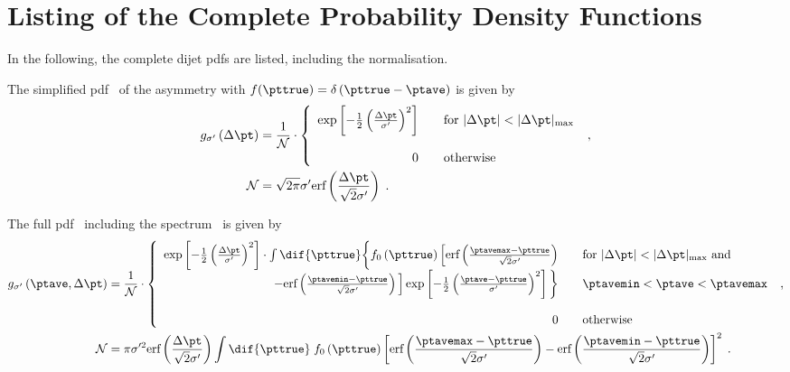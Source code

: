 \appendix


\section{Listing of the Complete Probability Density Functions}\label{sec:ResFit:App:Pdf}

In the following, the complete dijet pdfs are listed, including the normalisation.

The simplified pdf~ of the asymmetry with \mbox{$f(\pttrue)  = \delta\left(\pttrue - \ptave\right)$} is given by
\begin{align}
  \begin{split}
    \label{eq:ResFit:App:SimplePdf}
    g_{\sigma'}\left(\Delta\pt\right) & = \frac{1}{\mathcal{N}}\cdot\left\{
      \begin{array}{rl}
        \exp\left[-\frac{1}{2}\left(\frac{\Delta\pt}{\sigma'}\right)^{2}\right] & \quad\text{for } |\Delta\pt| < |\Delta\pt|_{\text{max}} \\
        & \\
        0 & \quad\text{otherwise}
      \end{array}
    \right. \;, \\
    \mathcal{N} & = \sqrt{2\pi}\sigma'\text{erf}\left(\frac{\Delta\pt}{\sqrt{2}\sigma'}\right) \;.
  \end{split}
\end{align}  

The full pdf~ including the spectrum~ is given by
\begin{align}
  \begin{split}
    \label{eq:ResFit:App:FullPdf}
    g_{\sigma'}\left(\ptave,\Delta\pt\right) & =
    \frac{1}{\mathcal{N}}\cdot\left\{
      \begin{array}{rl}
        \exp\left[-\frac{1}{2}\left(\frac{\Delta\pt}{\sigma'}\right)^{2}\right]\cdot\int\dif{\pttrue}\bigg\{f_{0}\left(\pttrue\right)\Big[\text{erf}\left(\frac{\ptavemax-\pttrue}{\sqrt{2}\sigma'}\right)  & \quad\text{for } |\Delta\pt| < |\Delta\pt|_{\text{max}}\text{ and} \\
        - \text{erf}\left(\frac{\ptavemin-\pttrue}{\sqrt{2}\sigma'}\right)\Big]\exp\left[-\frac{1}{2}\left(\frac{\ptave - \pttrue}{\sigma'}\right)^{2}\right]\bigg\} & \quad\ptavemin < \ptave < \ptavemax \\
        & \\
        0 & \quad\text{otherwise}
      \end{array}
    \right. \;, \\
    \mathcal{N} & = \pi\sigma'^{2}\text{erf}\left(\frac{\Delta\pt}{\sqrt{2}\sigma'}\right)\int\dif{\pttrue}\;f_{0}\left(\pttrue\right)\left[\text{erf}\left(\frac{\ptavemax-\pttrue}{\sqrt{2}\sigma'}\right) - \text{erf}\left(\frac{\ptavemin-\pttrue}{\sqrt{2}\sigma'}\right)\right]^{2}
    \;.
  \end{split}
\end{align}



